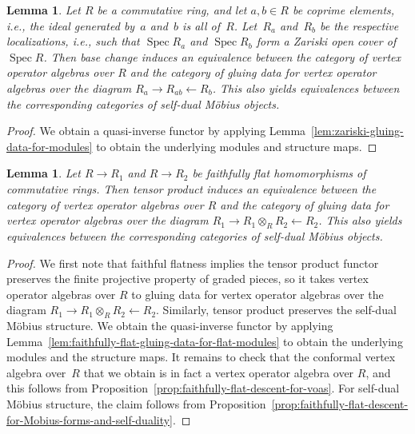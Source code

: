 \documentclass[pdftex]{sigma}
\DeclareMathOperator{\Spec}{Spec}
\newtheorem{lem}[thm]{Lemma}
\theoremstyle{definition}
\begin{document}
\begin{lem} \label{lem:zariski-gluing-for-voas}Let $R$ be a commutative ring, and let $a,b \in R$ be coprime elements, i.e., the ideal generated by~$a$ and~$b$ is all of~$R$. Let~$R_a$ and~$R_b$ be the respective localizations, i.e., such that $\Spec R_a$ and $\Spec R_b$ form a Zariski open cover of $\Spec R$. Then base change induces an equivalence between the category of vertex operator algebras over $R$ and the category of gluing data for vertex operator algebras over the diagram $R_a \to R_{ab} \leftarrow R_b$. This also yields equivalences between the corresponding categories of self-dual M\"obius objects.
\end{lem}
\begin{proof}We obtain a quasi-inverse functor by applying Lemma~\ref{lem:zariski-gluing-data-for-modules} to obtain the underlying modules and structure maps.
\end{proof}

\begin{lem} \label{lem:faithfully-flat-gluing-data-for-voas}Let $R \to R_1$ and $R \to R_2$ be faithfully flat homomorphisms of commutative rings. Then tensor product induces an equivalence between the category of vertex operator algebras over $R$ and the category of gluing data for vertex operator algebras over the diagram $R_1 \to R_1 \otimes_{R} R_2 \leftarrow R_2$. This also yields equivalences between the corresponding categories of self-dual M\"obius objects.
\end{lem}
\begin{proof}We first note that faithful flatness implies the tensor product functor preserves the finite projective property of graded pieces, so it takes vertex operator algebras over $R$ to gluing data for vertex operator algebras over the diagram $R_1 \to R_1 \otimes_{R} R_2 \leftarrow R_2$. Similarly, tensor pro\-duct preserves the self-dual M\"obius structure. We obtain the quasi-inverse functor by applying Lemma~\ref{lem:faithfully-flat-gluing-data-for-flat-modules} to obtain the underlying modules and the structure maps. It remains to check that the conformal vertex algebra over~$R$ that we obtain is in fact a vertex operator algebra over $R$, and this follows from Proposition~\ref{prop:faithfully-flat-descent-for-voas}. For self-dual M\"obius structure, the claim follows from Proposition~\ref{prop:faithfully-flat-descent-for-Mobius-forms-and-self-duality}.
\end{proof}
\end{document}

